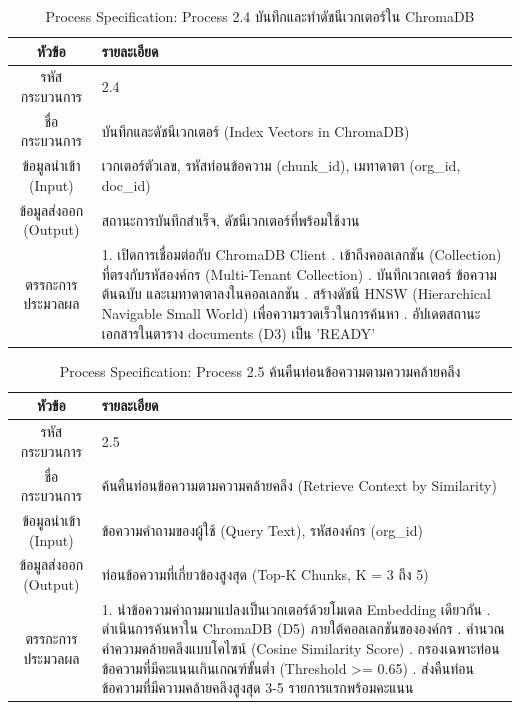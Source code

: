 \begin{table}[htbp]
\centering
\caption{Process Specification: Process 2.4 บันทึกและทำดัชนีเวกเตอร์ใน ChromaDB}
\label{tab3:pspec2_4}
\begin{tabularx}{\textwidth}{| c | L |}
\hline
\textbf{หัวข้อ} & \textbf{รายละเอียด} \\ \hline
รหัสกระบวนการ & 2.4 \\ \hline
ชื่อกระบวนการ & บันทึกและดัชนีเวกเตอร์ (Index Vectors in ChromaDB) \\ \hline
ข้อมูลนำเข้า (Input) & เวกเตอร์ตัวเลข, รหัสท่อนข้อความ (chunk\_id), เมทาดาตา (org\_id, doc\_id) \\ \hline
ข้อมูลส่งออก (Output) & สถานะการบันทึกสำเร็จ, ดัชนีเวกเตอร์ที่พร้อมใช้งาน \\ \hline
ตรรกะการประมวลผล & 1. เปิดการเชื่อมต่อกับ ChromaDB Client . เข้าถึงคอลเลกชัน (Collection) ที่ตรงกับรหัสองค์กร (Multi-Tenant Collection) . บันทึกเวกเตอร์ ข้อความต้นฉบับ และเมทาดาตาลงในคอลเลกชัน . สร้างดัชนี HNSW (Hierarchical Navigable Small World) เพื่อความรวดเร็วในการค้นหา . อัปเดตสถานะเอกสารในตาราง documents (D3) เป็น 'READY' \\ \hline
\end{tabularx}
\end{table}

\begin{table}[htbp]
\centering
\caption{Process Specification: Process 2.5 ค้นคืนท่อนข้อความตามความคล้ายคลึง}
\label{tab3:pspec2_5}
\begin{tabularx}{\textwidth}{| c | L |}
\hline
\textbf{หัวข้อ} & \textbf{รายละเอียด} \\ \hline
รหัสกระบวนการ & 2.5 \\ \hline
ชื่อกระบวนการ & ค้นคืนท่อนข้อความตามความคล้ายคลึง (Retrieve Context by Similarity) \\ \hline
ข้อมูลนำเข้า (Input) & ข้อความคำถามของผู้ใช้ (Query Text), รหัสองค์กร (org\_id) \\ \hline
ข้อมูลส่งออก (Output) & ท่อนข้อความที่เกี่ยวข้องสูงสุด (Top-K Chunks, K = 3 ถึง 5) \\ \hline
ตรรกะการประมวลผล & 1. นำข้อความคำถามมาแปลงเป็นเวกเตอร์ด้วยโมเดล Embedding เดียวกัน . ดำเนินการค้นหาใน ChromaDB (D5) ภายใต้คอลเลกชันขององค์กร . คำนวณค่าความคล้ายคลึงแบบโคไซน์ (Cosine Similarity Score) . กรองเฉพาะท่อนข้อความที่มีคะแนนเกินเกณฑ์ขั้นต่ำ (Threshold >= 0.65) . ส่งคืนท่อนข้อความที่มีความคล้ายคลึงสูงสุด 3-5 รายการแรกพร้อมคะแนน \\ \hline
\end{tabularx}
\end{table}

